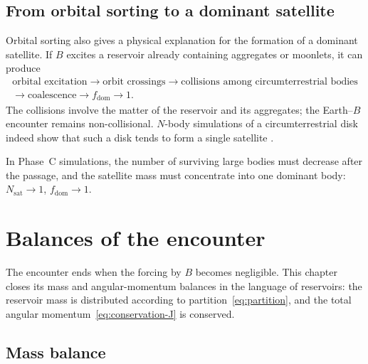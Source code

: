 \documentclass[11pt,a4paper,openany]{report}
\begin{document}
\section{From orbital sorting to a dominant satellite}

Orbital sorting also gives a physical explanation for the formation of a dominant satellite. If
$B$ excites a reservoir already containing aggregates or moonlets, it can produce
\begin{equation}
\begin{gathered}
\text{orbital excitation}\rightarrow\text{orbit crossings}\rightarrow
\text{collisions among circumterrestrial bodies}\\
\rightarrow\text{coalescence}\rightarrow f_{\mathrm{dom}}\rightarrow1.
\end{gathered}
\label{eq:chaine-dominance}
\end{equation}
The collisions involve the matter of the reservoir and its aggregates; the Earth--$B$ encounter
remains non-collisional. $N$-body simulations of a circumterrestrial disk indeed show that such a
disk tends to form a single satellite \cite{Kokubo2000}.

\begin{consequence}
In Phase~C simulations, the number of surviving large bodies must decrease after the passage, and
the satellite mass must concentrate into one dominant body: $N_{\mathrm{sat}}\to1$,
$f_{\mathrm{dom}}\to1$.
\end{consequence}

\chapter{Balances of the encounter}
\label{ch:bilans}

The encounter ends when the forcing by $B$ becomes negligible. This chapter closes its mass and
angular-momentum balances in the language of reservoirs: the reservoir mass is distributed
according to partition~\eqref{eq:partition}, and the total angular momentum~\eqref{eq:conservation-J}
is conserved.

\section{Mass balance}
\end{document}
